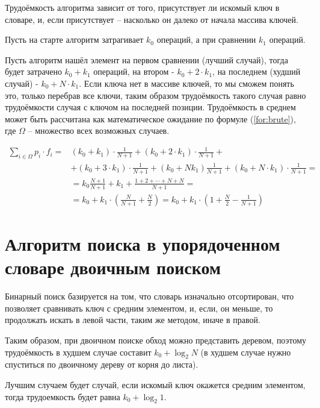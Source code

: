 Трудоёмкость алгоритма зависит от того, присутствует ли искомый ключ в словаре, и, если присутствует -- насколько он далеко от начала массива ключей.

Пусть на старте алгоритм затрагивает $k_{0}$ операций, а при сравнении $k_{1}$ операций. 

Пусть алгоритм нашёл элемент на первом сравнении (лучший случай), тогда будет затрачено $k_0 + k_1$ операций, на втором - $k_0 + 2 \cdot k_1$, на последнем (худший случай) - $k_0 + N \cdot k_1$. Если ключа нет в массиве ключей, то мы сможем понять это, только перебрав все ключи, таким образом трудоёмкость такого случая равно трудоёмкости случая с ключом на последней позиции. Трудоёмкость в среднем может быть рассчитана как математическое ожидание по формуле (\ref{for:brute}), где $\Omega$ -- множество всех возможных случаев.

\begin{equation}
\label{for:brute}
\begin{aligned}
\sum\limits_{i \in \Omega} p_i \cdot f_i = & (k_0 + k_1) \cdot \frac{1}{N + 1} + (k_0 + 2 \cdot k_1) \cdot \frac{1}{N+1} +\\& + (k_0 + 3 \cdot k_1) \cdot \frac{1}{N + 1} + (k_0 + Nk_1)\frac{1}{N + 1} + (k_0 + N \cdot k_1) \cdot \frac{1}{N + 1} =\\& = k_0\frac{N+1}{N+1}+k_1+\frac{1 + 2 + \cdots + N + N}{N + 1} = \\& = k_0 + k_1 \cdot \left(\frac{N}{N + 1} + \frac{N}{2}\right) = k_0 + k_1 \cdot \left(1 + \frac{N}{2} - \frac{1}{N + 1}\right)
\end{aligned}
\end{equation}

\section{Алгоритм поиска в упорядоченном словаре двоичным поиском}
Бинарный поиск базируется на том, что словарь изначально отсортирован, что позволяет сравнивать ключ с средним элементом, и, если, он меньше, то продолжать искать в левой части, таким же методом, иначе в правой.

Таким образом, при двоичном поиске \cite{binary} обход можно представить деревом, поэтому трудоёмкость в худшем случае составит $k_{0} + \log_2 N$ (в худшем случае нужно спуститься по двоичному дереву от корня до листа).

Лучшим случаем будет случай, если искомый ключ окажется средним элементом, тогда трудоемкость будет равна $k_{0} + \log_2 1$.

